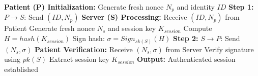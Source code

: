 
\begin{algorithm}[h]
\caption{PQC-MFA Authentication Protocol}
\label{alg:pqc-mfa}
\begin{algorithmic}[1]
\State \textbf{Patient (P) Initialization:}
\State Generate fresh nonce $N_p$ and identity $ID$
\State \textbf{Step 1:} $P \rightarrow S$: Send $(ID, N_p)$
\State
\State \textbf{Server (S) Processing:}
\State Receive $(ID, N_p)$ from Patient
\State Generate fresh nonce $N_s$ and session key $K_{session}$
\State Compute $H = hash(K_{session})$
\State Sign hash: $\sigma = Sign_{sk(S)}(H)$
\State \textbf{Step 2:} $S \rightarrow P$: Send $(N_s, \sigma)$
\State
\State \textbf{Patient Verification:}
\State Receive $(N_s, \sigma)$ from Server
\State Verify signature using $pk(S)$
\State Extract session key $K_{session}$
\State \textbf{Output:} Authenticated session established
\end{algorithmic}
\end{algorithm}
